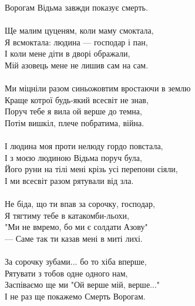 Ворогам Відьма завжди показує смерть.
\\
\\
Ще малим цуценям, коли маму смоктала,\\
Я всмоктала: людина — господар і пан,\\
І коли мене діти в дворі ображали,\\
Мій азовець мене не лишив сам на сам.
\\
\\
Ми міцніли разом синьожовтим вростаючи в землю\\
Краще котрої будь-який всесвіт не знав,\\
Поруч тебе я вила ой верше до темна,\\
Потім вишкіл, плече побратима, війна.
\\
\\
І людина моя проти нелюду гордо повстала,\\
І з моєю людиною Відьма поруч була,\\
Його руни на тілі мені крізь усі перепони сіяли,\\
І ми всесвіт разом рятували від зла.
\\
\\
Не біда, що ти впав за сорочку, господар,\\
Я тягтиму тебе в катакомби-льохи,\\
"Ми не вмремо, бо ми є солдати Азову"\\
— Саме так ти казав мені в миті лихі.
\\
\\
За сорочку зубами... бо то хіба вперше,\\
Рятувати з тобов одне одного нам,\\
Заспіваємо ще ми "Ой верше мій, верше..."\\
І не раз ще покажемо Смерть Ворогам.

\normalsize
